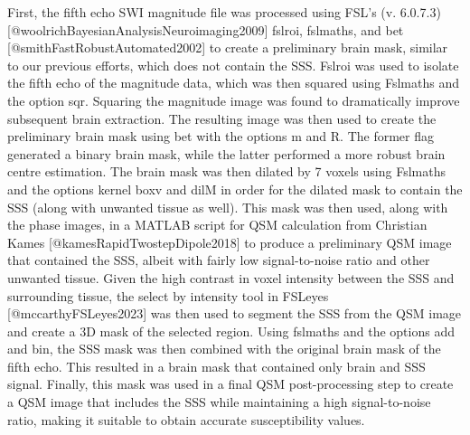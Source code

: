 \documentclass[
  letterpaper,
  DIV=11,
  numbers=noendperiod]{scrartcl}
\newenvironment{Shaded}{\begin{snugshade}}{\end{snugshade}}
\newcommand{\NormalTok}[1]{\textcolor[rgb]{0.00,0.23,0.31}{#1}}
\begin{document}
\begin{Shaded}
\begin{Highlighting}[]
\NormalTok{First, the fifth echo SWI magnitude file was processed using FSL’s (v. 6.0.7.3) [@woolrichBayesianAnalysisNeuroimaging2009] \textasciigrave{}fslroi\textasciigrave{}, \textasciigrave{}fslmaths\textasciigrave{}, and \textasciigrave{}bet\textasciigrave{} [@smithFastRobustAutomated2002] to create a preliminary brain mask, similar to our previous efforts, which does not contain the SSS. \textasciigrave{}Fslroi\textasciigrave{} was used to isolate the fifth echo of the magnitude data, which was then squared using Fslmaths and the option \textasciigrave{}{-}sqr\textasciigrave{}. Squaring the magnitude image was found to dramatically improve subsequent brain extraction. The resulting image was then used to create the preliminary brain mask using bet with the options \textasciigrave{}{-}m\textasciigrave{} and \textasciigrave{}{-}R\textasciigrave{}. The former flag generated a binary brain mask, while the latter performed a more robust brain centre estimation. The brain mask was then dilated by 7 voxels using \textasciigrave{}Fslmaths\textasciigrave{} and the options \textasciigrave{}{-}kernel boxv\textasciigrave{} and \textasciigrave{}{-}dilM\textasciigrave{} in order for the dilated mask to contain the SSS (along with unwanted tissue as well). This mask was then used, along with the phase images, in a MATLAB script for QSM calculation from Christian Kames [@kamesRapidTwostepDipole2018] to produce a preliminary QSM image that contained the SSS, albeit with fairly low signal{-}to{-}noise ratio and other unwanted tissue. Given the high contrast in voxel intensity between the SSS and surrounding tissue, the select by intensity tool in \textasciigrave{}FSLeyes\textasciigrave{} [@mccarthyFSLeyes2023] was then used to segment the SSS from the QSM image and create a 3D mask of the selected region. Using \textasciigrave{}fslmaths\textasciigrave{} and the options \textasciigrave{}{-}add\textasciigrave{} and \textasciigrave{}{-}bin\textasciigrave{}, the SSS mask was then combined with the original brain mask of the fifth echo. This resulted in a brain mask that contained only brain and SSS signal. Finally, this mask was used in a final QSM post{-}processing step to create a QSM image that includes the SSS while maintaining a high signal{-}to{-}noise ratio, making it suitable to obtain accurate susceptibility values.}


\end{Highlighting}
\end{Shaded}
\end{document}
